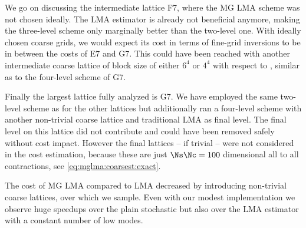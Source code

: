 We go on discussing the intermediate lattice F7, where the MG LMA scheme was not chosen ideally.
The LMA estimator is already not beneficial anymore, making the three-level scheme only marginally better than the two-level one.
With ideally chosen coarse grids, we would expect its cost in terms of fine-grid inversions to be in between the costs of E7 and G7.
This could have been reached with another intermediate coarse lattice of block size of either $6^4$ or $4^4$ with respect to , similar as to the four-level scheme of G7.

Finally the largest lattice fully analyzed is G7.
We have employed the same two-level scheme as for the other lattices but additionally ran a four-level scheme with another non-trivial coarse lattice and traditional LMA as final level.
The final level on this lattice did not contribute and could have been removed safely without cost impact.
However the final lattices -- if trivial -- were not considered in the cost estimation, because these are just $\Ns \Nc=100$ dimensional all to all contractions, see \cref{eq:mglma:coarsest:exact}.

The cost of MG LMA compared to LMA decreased by introducing non-trivial coarse lattices, over which we sample.
Even with our modest implementation we observe huge speedups over the plain stochastic but also over the LMA estimator with a constant number of low modes.

